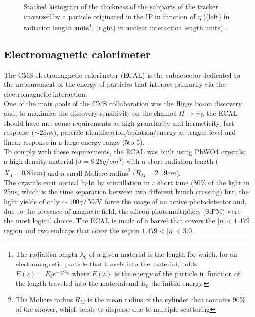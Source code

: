 \begin{figure}[h!]
\begin{minipage}{\linewidth}
\begin{minipage}{0.43\linewidth}
\end{minipage}
\caption[AAA]{Stacked histogram of the thickness of the subparts of the tracker traversed by a particle originated in the IP in function of $\eta$ ((left) in radiation length units\footnote{The radiation length $\lambda_0$ of a given material is the length for which, for an electromagnetic particle that travels into the material, holds $E(z)=E_0 e^{-z/\lambda_0}$ where $E(z)$ is the energy of the particle in function of the length traveled into the material and $E_0$ the initial energy.}, (right) in nuclear interaction length units)  \cite{TrackerMaterialBudgetplotsTWiki}.}
\end{minipage}

\end{figure}


\subsection{Electromagnetic calorimeter}
The CMS electromagnetic calorimeter (ECAL) \cite{HoferETHZurichHansHofer1997TheReport,Biino2015TheProjections} is the subdetector dedicated to the measurement of the energy of particles that interact primarily via the electromagnetic interaction.\\
One of the main goals of the CMS collaboration was the Higgs boson discovery and, to maximize the discovery sensitivity on the channel $H \to \gamma \gamma$, the ECAL should have met some requirements as high granularity and hermeticity, fast response ($\sim 25ns$), particle identification/isolation/energy at trigger level and linear response in a large energy range (5\GeV to 5\TeV).\\
To comply with these requirements, the ECAL was built using PbWO4 crystals: a high density material ($\delta=8.28g/cm^3$) with a short radiation length ($X_0=0.85cm$) and a small Moliere radius\footnote{The Moliere radius $R_M$ is the mean radius of the cylinder that contains 90\% of the shower, which tends to disperse due to multiple scattering} ($R_M=2.19cm$).\\
The crystals emit optical light by scintillation in a short time (80\% of the light in 25ns, which is the time separation between two different bunch crossing) but, the light yields of only $\sim 100 \gamma/{\,\text{Me\hspace{-.08em}V}}$ force the usage of an active photodetector and, due to the presence of magnetic field, the silicon photomultipliers (SiPM) were the most logical choice.
The ECAL is made of a barrel that covers the $|\eta|<1.479$ region and two endcaps that cover the region $1.479<|\eta|<3.0$.
